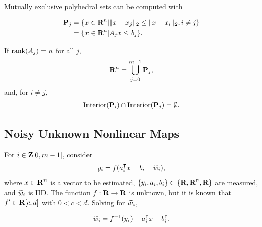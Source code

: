 \documentclass{article}
\begin{document}
    Mutually exclusive polyhedral sets can be computed with

    \begin{align*}
        \textbf{P}_j&=\{x\in\textbf{R}^n| \|x-x_j\|_2\leq\|x-x_i\|_2, i\neq j  \}\\
        &=\{x\in\textbf{R}^n|A_jx\leq b_j\}.
    \end{align*}

    If $\text{rank}(A_j)=n$ for all $j$,
    \begin{align*}
        \textbf{R}^n=\bigcup_{j=0}^{m-1} \textbf{P}_j,
    \end{align*}
    and, for $i\neq j$,
    \begin{align*}
        \text{Interior}(\textbf{P}_i)\cap\text{Interior}(\textbf{P}_j)=\emptyset.
    \end{align*}



\subsection{Noisy Unknown Nonlinear Maps}

    For $i\in\textbf{Z}[0,m-1]$, consider
    \begin{align*}
        y_i = f(a_i^\intercal x-b_i + \widetilde{w}_i),
    \end{align*}
    where $x\in\textbf{R}^n$ is a vector to be estimated,
    $\{y_i,a_i,b_i\}\in\{\textbf{R},\textbf{R}^n,\textbf{R}\}$ are measured,
    and $\widetilde{w}_i$ is IID.
    The function $f:\textbf{R}\to\textbf{R}$ is unknown, but it is known that
    $f'\in\textbf{R}[c,d]$ with $0<c<d$. Solving for $\widetilde{w}_i$,

    \begin{align*}
        \widetilde{w}_i = f^{-1}(y_i) - a_i^\intercal x + b_i^\intercal.
    \end{align*}
\end{document}
